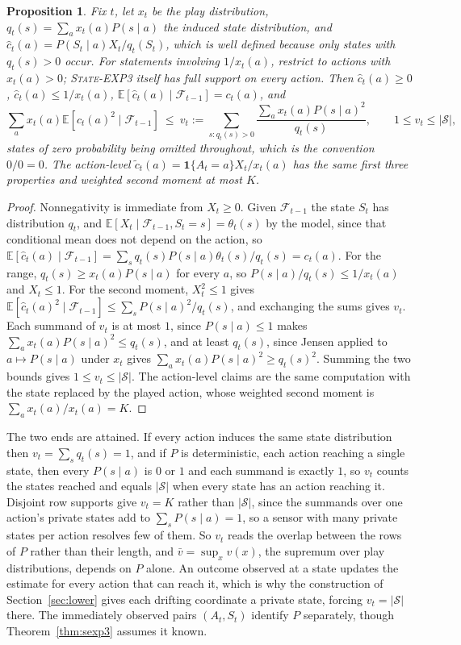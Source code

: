 \documentclass{article}
\newtheorem{proposition}{Proposition}
\theoremstyle{remark}
\newcommand{\Ex}{\mathbb{E}}
\newcommand{\Sset}{\mathcal{S}}
\begin{document}
\begin{proposition}\label{prop:pool}
Fix $t$, let $x_t$ be the play distribution, $q_t(s)=\sum_ax_t(a)P(s\mid a)$ the induced state
distribution, and $\hat c_t(a)=P(S_t\mid a)X_t/q_t(S_t)$, which is well defined because only
states with $q_t(s)>0$ occur. For statements involving $1/x_t(a)$, restrict to actions with
$x_t(a)>0$; \textup{\textsc{State-EXP3}} itself has full support on every action. Then $\hat c_t(a)\ge0$, $\hat c_t(a)\le1/x_t(a)$,
$\Ex[\hat c_t(a)\mid\mathcal F_{t-1}]=c_t(a)$, and
\[
\sum_ax_t(a)\Ex[\hat c_t(a)^2\mid\mathcal F_{t-1}]\ \le\ v_t
:=\sum_{s:q_t(s)>0}\frac{\sum_ax_t(a)P(s\mid a)^2}{q_t(s)},\qquad 1\le v_t\le|\Sset| ,
\]
states of zero probability being omitted throughout, which is the convention $0/0=0$.
The action-level $\tilde c_t(a)=\mathbf 1\{A_t=a\}X_t/x_t(a)$ has the same first three properties
and weighted second moment at most $K$.
\end{proposition}

\begin{proof}
Nonnegativity is immediate from $X_t\ge0$. Given $\mathcal F_{t-1}$ the state $S_t$ has
distribution $q_t$, and $\Ex[X_t\mid\mathcal F_{t-1},S_t=s]=\theta_t(s)$ by the model, since that
conditional mean does not depend on the action, so
$\Ex[\hat c_t(a)\mid\mathcal F_{t-1}]=\sum_sq_t(s)P(s\mid a)\theta_t(s)/q_t(s)=c_t(a)$. For the
range, $q_t(s)\ge x_t(a)P(s\mid a)$ for every $a$, so $P(s\mid a)/q_t(s)\le1/x_t(a)$ and
$X_t\le1$. For the second moment, $X_t^2\le1$ gives
$\Ex[\hat c_t(a)^2\mid\mathcal F_{t-1}]\le\sum_sP(s\mid a)^2/q_t(s)$, and exchanging the sums
gives $v_t$. Each summand of $v_t$ is at most $1$, since $P(s\mid a)\le1$ makes
$\sum_ax_t(a)P(s\mid a)^2\le q_t(s)$, and at least $q_t(s)$, since Jensen applied to
$a\mapsto P(s\mid a)$ under $x_t$ gives $\sum_ax_t(a)P(s\mid a)^2\ge q_t(s)^2$. Summing the two
bounds gives $1\le v_t\le|\Sset|$. The action-level claims are the same computation with the
state replaced by the played action, whose weighted second moment is $\sum_ax_t(a)/x_t(a)=K$.
\end{proof}

The two ends are attained. If every action induces the same state distribution then
$v_t=\sum_sq_t(s)=1$, and if $P$ is deterministic, each action reaching a single state, then
every $P(s\mid a)$ is $0$ or $1$ and each summand is exactly $1$, so $v_t$ counts the states
reached and equals $|\Sset|$ when every state has an action reaching it. Disjoint row supports
give $v_t=K$ rather than $|\Sset|$, since the summands over one action's private states add to
$\sum_sP(s\mid a)=1$, so a sensor with many private states per action resolves few of them. So $v_t$ reads the
overlap between the rows of $P$ rather than their length, and $\bar v=\sup_xv(x)$, the supremum
over play distributions, depends on $P$ alone. An outcome observed at a state updates the estimate
for every action that can reach it, which is why the construction of Section~\ref{sec:lower} gives
each drifting coordinate a private state, forcing $v_t=|\Sset|$ there. The immediately observed
pairs $(A_t,S_t)$ identify $P$ separately, though Theorem~\ref{thm:sexp3} assumes it known.
\end{document}

